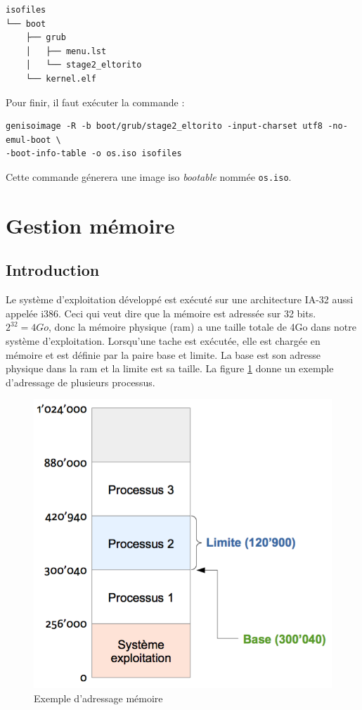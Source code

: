 \documentclass[a4paper]{article}
\begin{document}
\begin{verbatim}
isofiles
└── boot
    ├── grub
    │   ├── menu.lst
    │   └── stage2_eltorito
    └── kernel.elf
\end{verbatim}

Pour finir, il faut exécuter la commande :
\begin{verbatim}
genisoimage -R -b boot/grub/stage2_eltorito -input-charset utf8 -no-emul-boot \
-boot-info-table -o os.iso isofiles
\end{verbatim}
Cette commande génerera une image \acrshort{iso} \textit{bootable} nommée \texttt{os.iso}.

\newpage

\section{Gestion mémoire}
\subsection{Introduction}
Le système d'exploitation développé est exécuté sur une architecture \acrshort{IA-32}
aussi appelée i386. Ceci qui veut dire que la mémoire est adressée sur 32 bits.
$2^{32}=4Go$, donc la mémoire physique (\acrshort{ram}) a une taille totale de
4Go dans notre système d'exploitation. Lorsqu'une tache est exécutée, elle est chargée
en mémoire et est définie par la paire base et limite. La base est son adresse physique
dans la \acrshort{ram} et la limite est sa taille. La figure \ref{ex_base_limit}
donne un exemple d'adressage de plusieurs processus.

\begin{figure}[!h]
  \centering
  \includegraphics[scale=0.65]{images/ex_base_limit.png}
  \caption{Exemple d'adressage mémoire}
  \label{ex_base_limit}
\end{figure}
\end{document}
